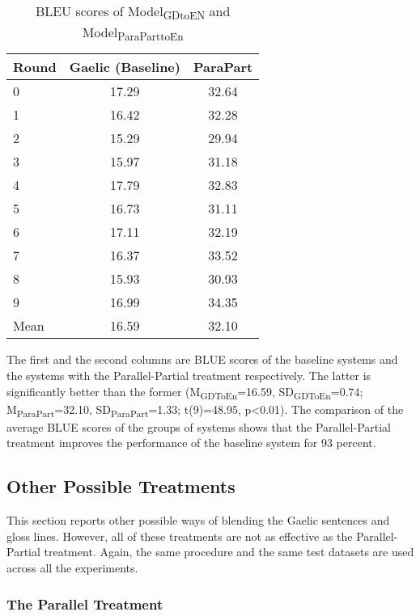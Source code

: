 \documentclass[a4paper]{article}
\begin{document}
\begin{table}[ht]
\centering
\begin{tabular}{lcc}
  \hline
Round & Gaelic (Baseline) & ParaPart \\ 
  \hline
0 & 17.29 & 32.64 \\ 
  1 & 16.42 & 32.28 \\ 
  2 & 15.29 & 29.94 \\ 
  3 & 15.97 & 31.18 \\ 
  4 & 17.79 & 32.83 \\ 
  5 & 16.73 & 31.11 \\ 
  6 & 17.11 & 32.19 \\ 
  7 & 16.37 & 33.52 \\ 
  8 & 15.93 & 30.93 \\ 
  9 & 16.99 & 34.35 \\ 
   \hline
Mean & 16.59 & 32.10 \\ 
   \hline
\end{tabular}
\caption{BLEU scores of Model\textsubscript{GDtoEN} and Model\textsubscript{ParaParttoEn}} 
\label{Table:ParaPart}
\end{table}
The first and the second columns are BLUE scores of the baseline systems and the systems with the Parallel-Partial treatment respectively. The latter is significantly better than the former
(M\textsubscript{GDToEn}=16.59, SD\textsubscript{GDToEn}=0.74; M\textsubscript{ParaPart}=32.10, SD\textsubscript{ParaPart}=1.33; t(9)=48.95, p<0.01).
The comparison of the average BLUE scores of the groups of systems shows that the Parallel-Partial treatment improves the performance of the baseline system for 93 percent.


\subsection{Other Possible Treatments}
This section reports other possible ways of blending the Gaelic sentences and gloss lines. However, all of these treatments are not as effective as the Parallel-Partial treatment. Again, the same procedure and the same test datasets are used across all the experiments.    

\subsubsection{The Parallel Treatment}\label{treatment:Para}
\end{document}
